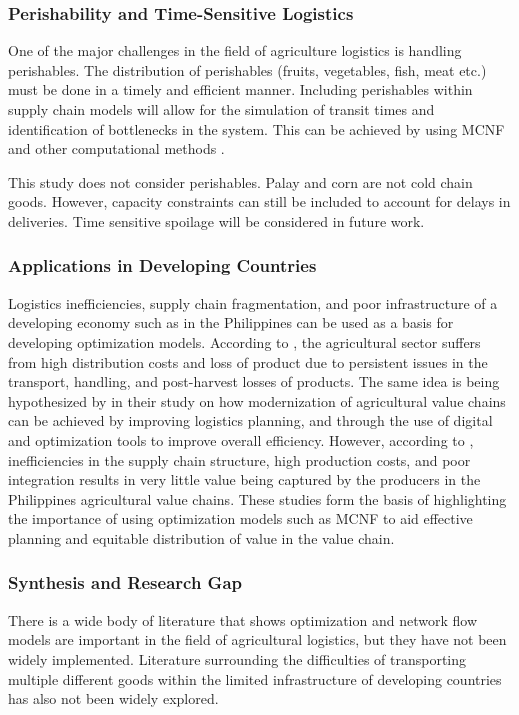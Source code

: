 \documentclass{icsthesis}
\begin{document}
\begin{mainmatter}
\subsubsection{Perishability and Time-Sensitive Logistics}
One of the major challenges in the field of agriculture logistics is handling perishables. The distribution of perishables (fruits, vegetables, fish, meat etc.) must be done in a timely and efficient manner. Including perishables within supply chain models will allow for the simulation of transit times and identification of bottlenecks in the system. This can be achieved by using MCNF and other computational methods \citep{esteso2021}.

This study does not consider perishables. Palay and corn are not cold chain goods. However, capacity constraints can still be included to account for delays in deliveries. Time sensitive spoilage will be considered in future work.


\subsubsection{Applications in Developing Countries}
Logistics inefficiencies, supply chain fragmentation, and poor infrastructure of a developing economy such as in the Philippines can be used as a basis for developing optimization models. According to \citet{pids2017}, the agricultural sector suffers from high distribution costs and loss of product due to persistent issues in the transport, handling, and post-harvest losses of products. The same idea is being hypothesized by \citet{briones2022} in their study on how modernization of agricultural value chains can be achieved by improving logistics planning, and through the use of digital and optimization tools to improve overall efficiency. However, according to \citet{adriano2022}, inefficiencies in the supply chain structure, high production costs, and poor integration results in very little value being captured by the producers in the Philippines agricultural value chains. These studies form the basis of highlighting the importance of using optimization models such as MCNF to aid effective planning and equitable distribution of value in the value chain.


\subsubsection{Synthesis and Research Gap}
There is a wide body of literature that shows optimization and network flow models are important in the field of agricultural logistics, but they have not been widely implemented. Literature surrounding the difficulties of transporting multiple different goods within the limited infrastructure of developing countries has also not been widely explored.


\end{mainmatter}
\end{document}
